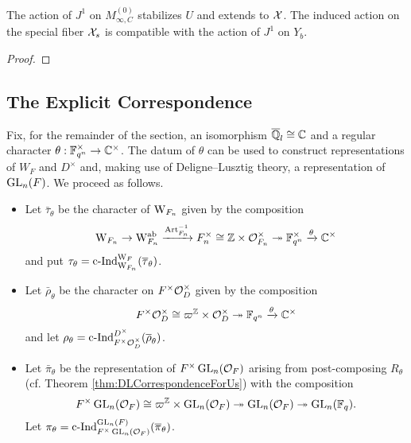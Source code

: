 \documentclass[../main.tex]{subfiles}
\begin{document}
\begin{prop}\label{prop:J1ActionOnAffinoid}
  The action of $J^1$ on $M_{\infty, C}^{(0)}$ stabilizes $U$ and extends to
  $\mathcal{X}$. The induced action on the special fiber $\mathcal{X}_s$ is compatible with the
  action of $J^1$ on $Y_b$.
\begin{proof}
\end{proof}
\end{prop}

\subsection{The Explicit Correspondence} %
\label{sub:The Explicit Correspondence}
Fix, for the remainder of the section, an isomorphism $\overline {\mathbb{Q}}_l \cong \mathbb{C}$ and
a regular character $\theta: \mathbb{F}_{q^n}^\times \to \mathbb{C}^\times$. 
The datum of $\theta$ can be used to construct representations 
of $W_F$ and $D^\times$ and, making use of Deligne--Lusztig
theory, a representation of $\operatorname{GL}_n(F)$. We proceed as follows.
\begin{itemize}
  \item Let $\bar \tau_\theta$ be the character of $\mathrm W_{F_n}$ given by 
    the composition
    \begin{equation*}
      \mathrm W_{F_n} \to \mathrm W_{F_n}^{\mathrm{ab}} \xrightarrow{\mathrm{Art}_{F_n}^{-1}} F_n^\times \cong
      \mathbb{Z} \times \mathcal{O}_{F_n}^\times \twoheadrightarrow \mathbb{F}_{q^n}^\times \xrightarrow{\theta} \mathbb{C}^\times
    \end{equation*}
  and put $\tau_\theta = \mathrm{c\text{-}Ind}_{\mathrm W_{F_n}}^{\mathrm W_F}(\overline \tau_\theta)$.
  \item Let $\bar \rho_\theta$ be the character on 
    $F^\times \mathcal{O}_D^\times$ given by the composition
    \begin{equation*}
      F^\times\mathcal{O}_D^\times \cong \varpi^{\mathbb{Z}} \times \mathcal{O}_D^\times \twoheadrightarrow 
      \mathbb{F}_{q^n} \xrightarrow{\theta} \mathbb{C}^\times
    \end{equation*}
    and let $\rho_\theta = \mathrm{c\text{-}Ind}_{F^\times \mathcal{O}_D^\times}^{D^\times}(\overline \rho_\theta)$.
  \item Let $\bar \pi_\theta$ be the representation of $F^\times \operatorname{GL}_n(\mathcal{O}_F)$
    arising from post-composing $R_\theta$ (cf. Theorem
    \ref{thm:DLCorrespondenceForUs}) with the composition
    \begin{equation*}
      F^\times \operatorname{GL}_n(\mathcal{O}_F) \cong \varpi^{\mathbb{Z}} \times \operatorname{GL}_n(\mathcal{O}_F)
      \twoheadrightarrow \operatorname{GL}_n(\mathcal{O}_F) \twoheadrightarrow \operatorname{GL}_n(\mathbb{F}_q).
    \end{equation*}
    Let $\pi_\theta = \mathrm{c\text{-}Ind}_{F^\times \operatorname{GL}_n(\mathcal{O}_F)}^{\operatorname{GL}_n(F)}(\overline \pi_\theta)$. 
\end{itemize}
\end{document}
